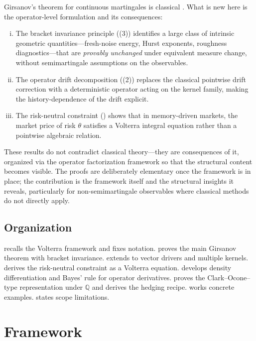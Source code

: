 \documentclass[11pt]{article}
\theoremstyle{plain}
\theoremstyle{definition}
\theoremstyle{remark}
\newcommand{\QQ}{\mathbb{Q}}
\begin{document}
Girsanov's theorem for continuous martingales is classical
\cite{KaratzasShreve1991}. What is new here is the operator-level
formulation and its consequences:
\begin{enumerate}[(i)]
\item The bracket invariance principle ((3))
  identifies a large class of intrinsic geometric quantities---fresh-noise
  energy, Hurst exponents, roughness diagnostics---that are \emph{provably
  unchanged} under equivalent measure change, without semimartingale
  assumptions on the observables.
\item The operator drift decomposition ((2))
  replaces the classical pointwise drift correction with a
  deterministic operator acting on the kernel family, making the
  history-dependence of the drift explicit.
\item The risk-neutral constraint () shows that
  in memory-driven markets, the market price of risk $\theta$ satisfies a
  Volterra integral equation rather than a pointwise algebraic relation.
\end{enumerate}
These results do not contradict classical theory---they are consequences of
it, organized via the operator factorization framework so that the
structural content becomes visible. The proofs are deliberately elementary
once the framework is in place; the contribution is the framework itself
and the structural insights it reveals, particularly for non-semimartingale
observables where classical methods do not directly apply.

\subsection{Organization}

 recalls the Volterra framework and fixes notation.
 proves the main Girsanov theorem with bracket invariance.
 extends to vector drivers and multiple kernels.
 derives the risk-neutral constraint as a Volterra equation.
 develops density differentiation and Bayes' rule for
operator derivatives.  proves the Clark--Ocone--type
representation under $\QQ$ and derives the hedging recipe.  works concrete examples.
 states scope limitations.

\section{Framework}\label{sec:framework}
\end{document}
